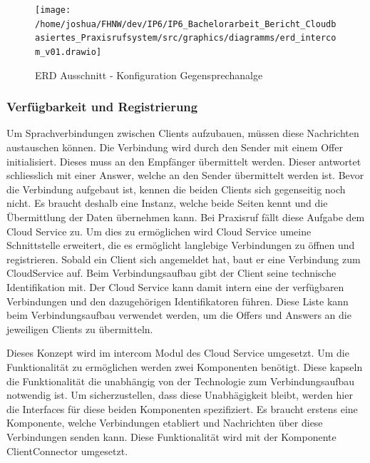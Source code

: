 \begin{figure}[h]
    \centering
    \begin{minipage}[b]{0.7\textwidth}
        \texttt{[image: /home/joshua/FHNW/dev/IP6/IP6\_Bachelorarbeit\_Bericht\_Cloudbasiertes\_Praxisrufsystem/src/graphics/diagramms/erd\_intercom\_v01.drawio]}
        \caption{ERD Ausschnitt - Konfiguration Gegensprechanalge}
    \end{minipage}
\end{figure}




\clearpage
\subsubsection*{Verfügbarkeit und Registrierung}

Um Sprachverbindungen zwischen Clients aufzubauen, müssen diese Nachrichten austauschen können.
Die Verbindung wird durch den Sender mit einem Offer initialisiert.
Dieses muss an den Empfänger übermittelt werden.
Dieser antwortet schliesslich mit einer Answer, welche an den Sender übermittelt werden ist.
Bevor die Verbindung aufgebaut ist, kennen die beiden Clients sich gegenseitig noch nicht.
Es braucht deshalb eine Instanz, welche beide Seiten kennt und die Übermittlung der Daten übernehmen kann.
Bei Praxisruf fällt diese Aufgabe dem Cloud Service zu.
Um dies zu ermöglichen wird Cloud Service umeine Schnittstelle erweitert, die es ermöglicht langlebige Verbindungen
zu öffnen und registrieren.
Sobald ein Client sich angemeldet hat, baut er eine Verbindung zum CloudService auf.
Beim Verbindungsaufbau gibt der Client seine technische Identifikation mit.
Der Cloud Service kann damit intern eine der verfügbaren Verbindungen und den dazugehörigen Identifikatoren führen.
Diese Liste kann beim Verbindungsaufbau verwendet werden, um die Offers und Answers an die jeweiligen Clients zu übermitteln.

Dieses Konzept wird im intercom Modul des Cloud Service umgesetzt.
Um die Funktionalität zu ermöglichen werden zwei Komponenten benötigt.
Diese kapseln die Funktionalität die unabhängig von der Technologie zum Verbindungsaufbau notwendig ist.
Um sicherzustellen, dass diese Unabhägigkeit bleibt, werden hier die Interfaces für diese beiden Komponenten spezifiziert.
Es braucht erstens eine Komponente, welche Verbindungen etabliert und Nachrichten über diese Verbindungen senden kann.
Diese Funktionalität wird mit der Komponente ClientConnector umgesetzt.




